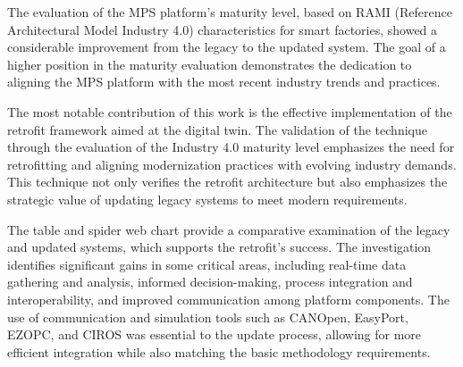 \documentclass[journal]{IEEEtran}
\begin{document}
The evaluation of the MPS platform's maturity level, based on RAMI (Reference Architectural Model Industry 4.0) characteristics for smart factories, showed a considerable improvement from the legacy to the updated system. The goal of a higher position in the maturity evaluation demonstrates the dedication to aligning the MPS platform with the most recent industry trends and practices.

The most notable contribution of this work is the effective implementation of the retrofit framework aimed at the digital twin. The validation of the technique through the evaluation of the Industry 4.0 maturity level emphasizes the need for retrofitting and aligning modernization practices with evolving industry demands. This technique not only verifies the retrofit architecture but also emphasizes the strategic value of updating legacy systems to meet modern requirements.

The table and spider web chart provide a comparative examination of the legacy and updated systems, which supports the retrofit's success. The investigation identifies significant gains in some critical areas, including real-time data gathering and analysis, informed decision-making, process integration and interoperability, and improved communication among platform components. The use of communication and simulation tools such as CANOpen, EasyPort, EZOPC, and CIROS was essential to the update process, allowing for more efficient integration while also matching the basic methodology requirements.




\end{document}
